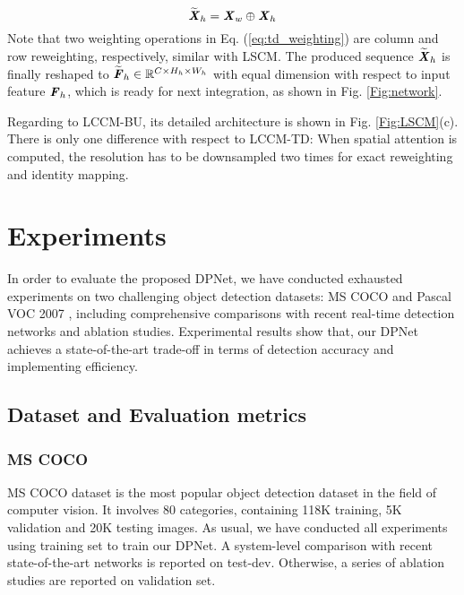 \documentclass[lettersize,journal]{IEEEtran}
\begin{document}
\begin{equation}
	\widetilde{\textbf{\emph{X}}}_{h} =\textbf{\emph{X}}_w \oplus \textbf{\emph{X}}_h
\end{equation}
Note that two weighting operations in Eq. (\ref{eq:td_weighting}) are column and row reweighting, respectively, similar with LSCM. The produced sequence $\widetilde{\textbf{\emph{X}}}_h$ is finally reshaped to $\widetilde{\textbf{\emph{F}}}_h\in\mathbb{R}^{C \times H_h \times W_h}$ with equal dimension with respect to input feature $\textbf{\emph{F}}_h$, which is ready for next integration, as shown in Fig. \ref{Fig:network}.



Regarding to LCCM-BU, its detailed architecture is shown in Fig. \ref{Fig:LSCM}(c). There is only one difference with respect to LCCM-TD: When spatial attention is computed, the resolution has to be downsampled two times for exact reweighting and identity mapping.







\section{Experiments}\label{sec:Experimence}

In order to evaluate the proposed DPNet, we have conducted exhausted experiments on two challenging object detection datasets: MS COCO\cite{lin2014microsoft} and Pascal VOC 2007 \cite{everingham2010pascal}, including comprehensive comparisons with recent real-time detection networks and ablation studies. Experimental results show that, our DPNet achieves a state-of-the-art trade-off in terms of detection accuracy and implementing efficiency.

\subsection{ Dataset and Evaluation metrics}
\subsubsection{MS COCO}
MS COCO dataset \cite{lin2014microsoft} is the most popular object detection dataset in the field of computer vision. It involves 80 categories, containing 118K training, 5K validation and 20K testing images. As usual, we have conducted all experiments using training set to train our DPNet. A system-level comparison with recent state-of-the-art networks is reported on test-dev. Otherwise, a series of ablation studies are reported on validation set.
\end{document}
